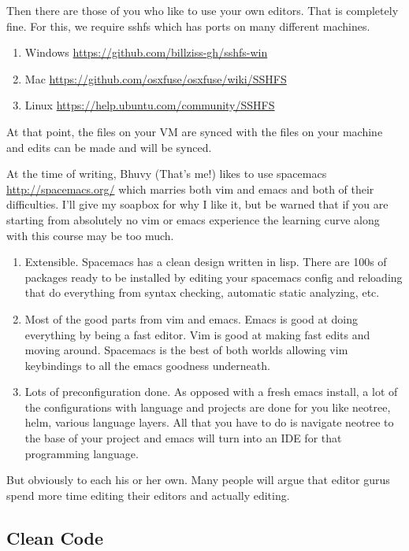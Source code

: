 Then there are those of you who like to use your own editors. That is completely fine.
For this, we require sshfs which has ports on many different machines.

\begin{enumerate}
\item Windows \url{https://github.com/billziss-gh/sshfs-win}
\item Mac \url{https://github.com/osxfuse/osxfuse/wiki/SSHFS}
\item Linux \url{https://help.ubuntu.com/community/SSHFS}
\end{enumerate}

At that point, the files on your VM are synced with the files on your machine and edits can be made and will be synced.

At the time of writing, Bhuvy (That's me!) likes to use spacemacs \url{http://spacemacs.org/} which marries both vim and emacs and both of their difficulties.
I'll give my soapbox for why I like it, but be warned that if you are starting from absolutely no vim or emacs experience the learning curve along with this course may be too much.
\begin{enumerate}
\item Extensible. Spacemacs has a clean design written in lisp. There are 100s of packages ready to be installed by editing your spacemacs config and reloading that do everything from syntax checking, automatic static analyzing, etc.
\item Most of the good parts from vim and emacs. Emacs is good at doing everything by being a fast editor. Vim is good at making fast edits and moving around. Spacemacs is the best of both worlds allowing vim keybindings to all the emacs goodness underneath.
\item Lots of preconfiguration done. As opposed with a fresh emacs install, a lot of the configurations with language and projects are done for you like neotree, helm, various language layers. All that you have to do is navigate neotree to the base of your project and emacs will turn into an IDE for that programming language.
\end{enumerate}

But obviously to each his or her own.
Many people will argue that editor gurus spend more time editing their editors and actually editing.

\subsection{Clean Code}

